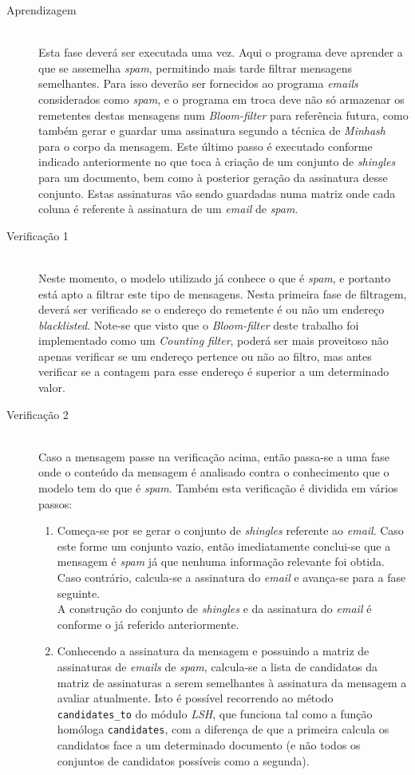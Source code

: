 \documentclass[a4paper,11pt,openright,oneside]{report}
\begin{document}
\begin{description}
\item[Aprendizagem] \hfill \\
  Esta fase deverá ser executada uma vez. Aqui o programa deve aprender a que se assemelha \textit{spam}, permitindo mais tarde filtrar mensagens semelhantes. Para isso deverão ser fornecidos ao programa \textit{emails} considerados como \textit{spam}, e o programa em troca deve não só armazenar os remetentes destas mensagens num \textit{Bloom-filter} para referência futura, como também gerar e guardar uma assinatura segundo a técnica de \textit{Minhash} para o corpo da mensagem. Este último passo é executado conforme indicado anteriormente no que toca à criação de um conjunto de \textit{shingles} para um documento, bem como à posterior geração da assinatura desse conjunto. Estas assinaturas vão sendo guardadas numa matriz onde cada coluna é referente à assinatura de um \textit{email} de \textit{spam}.
\item[Verificação 1] \hfill \\
  Neste momento, o modelo utilizado já conhece o que é \textit{spam}, e portanto está apto a filtrar este tipo de mensagens. Nesta primeira fase de filtragem, deverá ser verificado se o endereço do remetente é ou não um endereço \textit{blacklisted}. Note-se que visto que o \textit{Bloom-filter} deste trabalho foi implementado como um \textit{Counting filter}, poderá ser mais proveitoso não apenas verificar se um endereço pertence ou não ao filtro, mas antes verificar se a contagem para esse endereço é superior a um determinado valor.
\item[Verificação 2] \hfill \\
  Caso a mensagem passe na verificação acima, então passa-se a uma fase onde o conteúdo da mensagem é analisado contra o conhecimento que o modelo tem do que é \textit{spam}. Também esta verificação é dividida em vários passos:
  \begin{enumerate}
  \item Começa-se por se gerar o conjunto de \textit{shingles} referente ao \textit{email}. Caso este forme um conjunto vazio, então imediatamente conclui-se que a mensagem é \textit{spam} já que nenhuma informação relevante foi obtida. Caso contrário, calcula-se a assinatura do \textit{email} e avança-se para a fase seguinte. \\
    A construção do conjunto de \textit{shingles} e da assinatura do \textit{email} é conforme o já referido anteriormente.
  \item Conhecendo a assinatura da mensagem e possuindo a matriz de assinaturas de \textit{emails} de \textit{spam}, calcula-se a lista de candidatos da matriz de assinaturas a serem semelhantes à assinatura da mensagem a avaliar atualmente. Isto é possível recorrendo ao método \texttt{candidates\_to} do módulo \textit{LSH}, que funciona tal como a função homóloga \texttt{candidates}, com a diferença de que a primeira calcula os candidatos face a um determinado documento (e não todos os conjuntos de candidatos possíveis como a segunda). \\

\end{enumerate}
\end{description}
\end{document}
